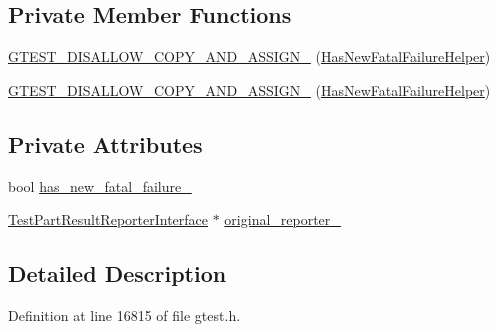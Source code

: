 \subsection*{\-Private \-Member \-Functions}
\begin{DoxyCompactItemize}
\item 
\hyperlink{classtesting_1_1internal_1_1HasNewFatalFailureHelper_a152e2f14c24601957770d46ee3edf8c8}{\-G\-T\-E\-S\-T\-\_\-\-D\-I\-S\-A\-L\-L\-O\-W\-\_\-\-C\-O\-P\-Y\-\_\-\-A\-N\-D\-\_\-\-A\-S\-S\-I\-G\-N\-\_\-} (\hyperlink{classtesting_1_1internal_1_1HasNewFatalFailureHelper}{\-Has\-New\-Fatal\-Failure\-Helper})
\item 
\hyperlink{classtesting_1_1internal_1_1HasNewFatalFailureHelper_a152e2f14c24601957770d46ee3edf8c8}{\-G\-T\-E\-S\-T\-\_\-\-D\-I\-S\-A\-L\-L\-O\-W\-\_\-\-C\-O\-P\-Y\-\_\-\-A\-N\-D\-\_\-\-A\-S\-S\-I\-G\-N\-\_\-} (\hyperlink{classtesting_1_1internal_1_1HasNewFatalFailureHelper}{\-Has\-New\-Fatal\-Failure\-Helper})
\end{DoxyCompactItemize}
\subsection*{\-Private \-Attributes}
\begin{DoxyCompactItemize}
\item 
bool \hyperlink{classtesting_1_1internal_1_1HasNewFatalFailureHelper_ac016dfb0d4a098e75505d926cf6cae69}{has\-\_\-new\-\_\-fatal\-\_\-failure\-\_\-}
\item 
\hyperlink{classtesting_1_1TestPartResultReporterInterface}{\-Test\-Part\-Result\-Reporter\-Interface} $\ast$ \hyperlink{classtesting_1_1internal_1_1HasNewFatalFailureHelper_ab0d32f3081f7eed6e6d666da323ab32a}{original\-\_\-reporter\-\_\-}
\end{DoxyCompactItemize}


\subsection{\-Detailed \-Description}


\-Definition at line 16815 of file gtest.\-h.



